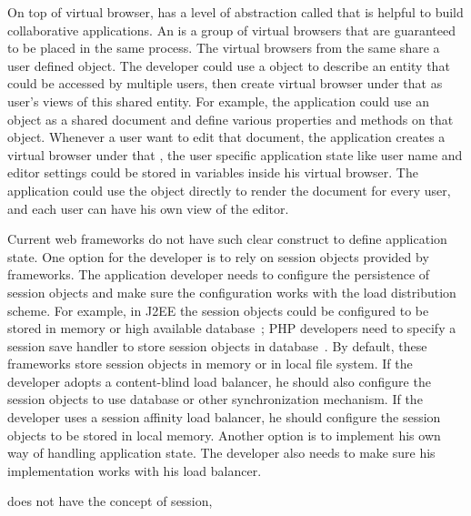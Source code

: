 On top of virtual browser, 
\cb{} has a level of abstraction called \appins{} that is helpful
to build collaborative applications.
An \appins{} is a group of virtual browsers that are guaranteed to be placed
in the same \cb{} process.
The virtual browsers from the same \appins{} share a user defined \appins{} object.
The developer could use a \appins{} object to describe an entity that 
could be accessed by multiple users, 
then create virtual browser under that \appins{} as user's views of this shared entity.
For example, the application could use an \appins{} object as a shared document and 
define various properties and methods on that object.
Whenever a user want to edit that document, the application
creates a virtual browser under that \appins{},
the user specific application state like user name and editor settings 
could be stored in variables inside his virtual browser.
The application could use the \appins{} object directly to render the document for every user, 
and each user can have his own view of the editor.

Current web frameworks do not have such clear construct to define application state.
One option for the developer is to rely on session objects provided by frameworks.
The application developer needs to configure the persistence  of session objects 
and make sure the configuration works with the load distribution scheme.
For example, in J2EE the session objects could be configured to be stored in memory or
high available database~\cite{j2eedoc}; 
PHP developers need to specify a session save handler to store session objects 
in database~\cite{phpdoc}.
By default, these frameworks store session objects in memory or in local file system.
If the developer adopts a content-blind load balancer, 
he should also configure the session objects to use database or other
synchronization mechanism.
If the developer uses a session affinity load balancer,
he should configure the session objects to be stored in local memory.
Another option is to implement his own way of handling application state.
The developer also needs to make sure his implementation works with
his load balancer.

\cb{} does not have the concept of session,





\webscaleout{}